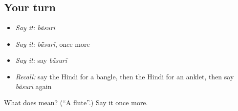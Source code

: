 \subsection*{Your turn}
\begin{itemize}
\raggedright
  \item \emph{Say it:} \emph{bā̃surī}
  \item \emph{Say it:} \emph{bā̃surī}, once more
  \item \emph{Say it:} say \emph{bā̃surī}
  \item \emph{Recall:} say the Hindi for a bangle, then the Hindi for an anklet, then say \emph{bā̃surī} again
\end{itemize}

\begin{tcolorbox}[breakable,colback=teal!4,colframe=teal!35!black,title={Before you move on}]
What does  mean? (\textquotedblleft{}A flute\textquotedblright{}.) Say it once more.
\end{tcolorbox}
